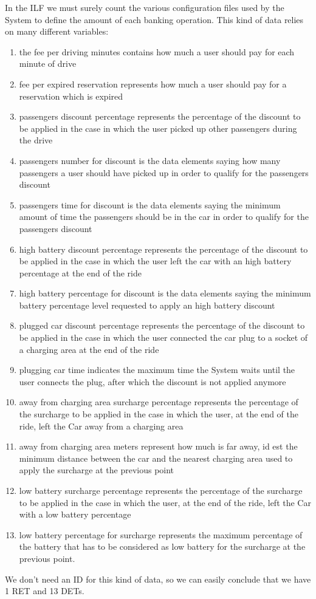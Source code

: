 In the ILF we must surely count the various configuration files used by the System to define the amount of each banking operation. This kind of data relies on many different variables:
\begin{enumerate}
	\item the fee per driving minutes contains how much a user should pay for each minute of drive
	\item fee per expired reservation represents how much a user should pay for a reservation which is expired
	\item passengers discount percentage represents the percentage of the discount to be applied in the case in which the user picked up other passengers during the drive
	\item passengers number for discount is the data elements saying how many passengers a user should have picked up in order to qualify for the passengers discount
	\item passengers time for discount is the data elements saying the minimum amount of time the passengers should be in the car in order to qualify for the passengers discount
	\item high battery discount percentage represents the percentage of the discount to be applied in the case in which the user left the car with an high battery percentage at the end of the ride
	\item high battery percentage for discount  is the data elements saying the minimum battery percentage level requested to apply an high battery discount
	\item plugged car discount percentage represents the percentage of the discount to be applied in the case in which the user connected the car plug to a socket of a charging area at the end of the ride
	\item plugging car time indicates the maximum time the System waits until the user connects the plug, after which the discount is not applied anymore
	\item away from charging area surcharge percentage represents the percentage of the surcharge to be applied in the case in which the user, at the end of the ride, left the Car away from a charging area
	\item away from charging area meters represent how much is far away, id est the minimum distance between the car and the nearest charging area used to apply the surcharge at the previous point
	\item low battery surcharge percentage represents the percentage of the surcharge to be applied in the case in which the user, at the end of the ride, left the Car with a low battery percentage
	\item low battery percentage for surcharge represents the maximum percentage of the battery that has to be considered as low battery for the surcharge at the previous point.
\end{enumerate}
We don't need an ID for this kind of data, so we can easily conclude that we have 1 RET and 13 DETs.
\bigskip

